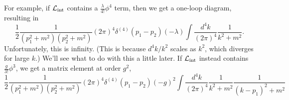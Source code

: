 For example, if $\mathcal L_\text{int}$ contains a $\frac{\lambda}{4!}\phi^4$ term, then we get a one-loop diagram, resulting in 
\begin{equation}
    \frac{1}{2} \frac{1}{(p_1^2+m^2)(p_2^2 +m^2)} (2\pi)^4 \delta^{(4)}(p_1-p_2)(-\lambda) \int \frac{d^4k}{(2\pi)^4} \frac{1}{k^2+m^2}.
\end{equation}
Unfortunately, this is infinity. (This is because $d^4k / k^2$ scales as $k^2$, which diverges for large $k$.) We'll see what to do with this a little later. If $\mathcal L_\text{int}$ instead contains $\frac{g}{3!}\phi^3$, we get a matrix element at order $g^2$,
\begin{equation}
    \frac{1}{2} \frac{1}{(p_1^2+m^2)(p_2^2+m^2)} (2\pi)^4 \delta^{(4)}(p_1-p_2)(-g)^2 \int \frac{d^4k}{(2\pi)^4} \frac{1}{k^2+m^2} \frac{1}{(k-p_1)^2 +m^2}
\end{equation}
